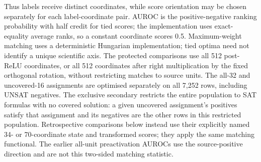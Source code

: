 \documentclass[
  british,
  11pt,
  a4paper,
]{article}
\begin{document}
Thus labels receive distinct coordinates, while score orientation may be
chosen separately for each label-coordinate pair. AUROC is the
positive-negative ranking probability with half credit for tied scores;
the implementation uses exact-equality average ranks, so a constant
coordinate scores 0.5. Maximum-weight matching uses a deterministic
Hungarian implementation; tied optima need not identify a unique
scientific axis. The protected comparisons use all 512 post-ReLU
coordinates, or all 512 coordinates after right multiplication by the
fixed orthogonal rotation, without restricting matches to source units.
The all-32 and uncovered-16 assignments are optimised separately on all
7,252 rows, including UNSAT negatives. The exclusive secondary restricts
the entire population to SAT formulas with no covered solution: a given
uncovered assignment's positives satisfy that assignment and its
negatives are the other rows in this restricted population.
Retrospective comparisons below instead use their explicitly named 34-
or 70-coordinate state and transformed scores; they apply the same
matching functional. The earlier all-unit preactivation AUROCs use the
source-positive direction and are not this two-sided matching statistic.
\end{document}
